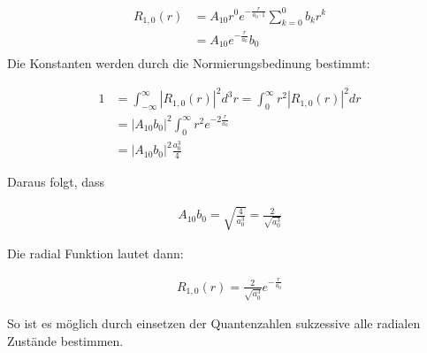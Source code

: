 \begin{align}
  \label{eq:49}
  R_{1,0}(r) &= A_{10}r^{0}e^{-\frac{r}{a_0 \cdot 1}}\sum^{0}_{k=0} b_kr^k\\
&= A_{10}e^{-\frac{r}{a_0 }}b_0\\
\end{align}
Die Konstanten werden durch die Normierungsbedinung bestimmt:

\begin{align}
  \label{eq:50}
  1 &= \int_{-\infty}^{\infty} |R_{1,0}(r)|^2d^3r = \int_{0}^{\infty} r^2 |R_{1,0}(r)|^2 dr\\
&=  |A_{10}b_0|^2 \int_{0}^{\infty} r^2e^{-2\frac{r}{a_0 }}\\
&=  |A_{10}b_0|^2  \frac{a_0^3}{4}
\end{align}

Daraus folgt, dass 

\begin{align}
  \label{eq:51}
  A_{10}b_0 = \sqrt{ \frac{4}{a_0^3}} = \frac{2}{\sqrt{a_0^3}}
\end{align}

Die radial Funktion lautet dann:

\begin{align}
  \label{eq:52}
  R_{1,0}(r)= \frac{2}{\sqrt{a_0^3}} e^{-\frac{r}{a_0 }}
\end{align}

So ist es möglich durch einsetzen der Quantenzahlen sukzessive alle radialen Zustände bestimmen.



